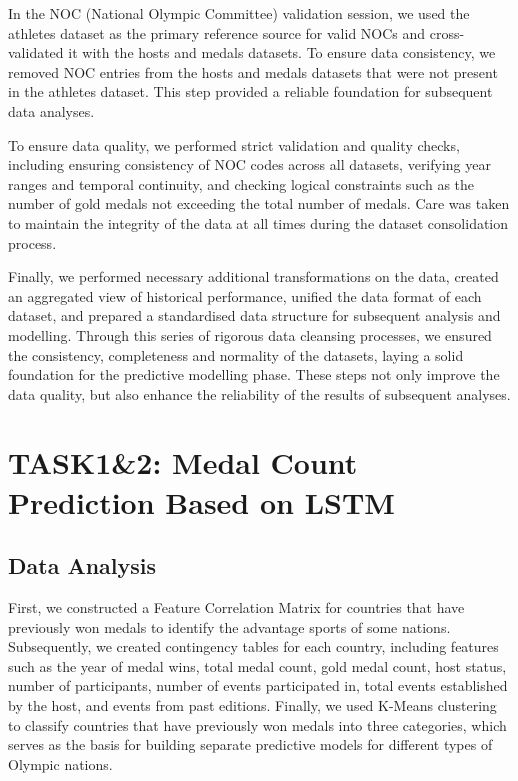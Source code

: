 \documentclass{mcmthesis}
\begin{document}
In the NOC (National Olympic Committee) validation session, we used the athletes dataset as the primary reference source for valid NOCs and cross-validated it with the hosts and medals datasets. To ensure data consistency, we removed NOC entries from the hosts and medals datasets that were not present in the athletes dataset. This step provided a reliable foundation for subsequent data analyses.

To ensure data quality, we performed strict validation and quality checks, including ensuring consistency of NOC codes across all datasets, verifying year ranges and temporal continuity, and checking logical constraints such as the number of gold medals not exceeding the total number of medals. Care was taken to maintain the integrity of the data at all times during the dataset consolidation process.

Finally, we performed necessary additional transformations on the data, created an aggregated view of historical performance, unified the data format of each dataset, and prepared a standardised data structure for subsequent analysis and modelling. Through this series of rigorous data cleansing processes, we ensured the consistency, completeness and normality of the datasets, laying a solid foundation for the predictive modelling phase. These steps not only improve the data quality, but also enhance the reliability of the results of subsequent analyses.


\section{TASK1\&2: Medal Count Prediction Based on LSTM}

\subsection{Data Analysis}
First, we constructed a Feature Correlation Matrix for countries that have previously won medals to identify the advantage sports of some nations. Subsequently, we created contingency tables for each country, including features such as the year of medal wins, total medal count, gold medal count, host status, number of participants, number of events participated in, total events established by the host, and events from past editions. Finally, we used K-Means clustering to classify countries that have previously won medals into three categories, which serves as the basis for building separate predictive models for different types of Olympic nations.
\end{document}
